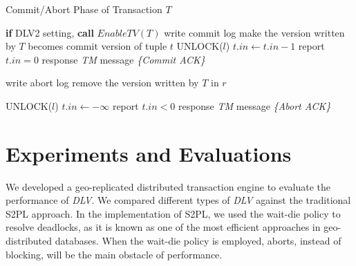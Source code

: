 \documentclass[conference]{IEEEtran}
\begin{document}
\begin{algorithm}[!h]
  \caption{Commit/Abort Phase of Transaction ${T}$}
  \begin{algorithmic}[1]
    \State \textbf{if} DLV2 setting, \textbf{call} ${EnableTV(T)}$ 
    \State write commit log
      \State make the version written by ${T}$ becomes commit version of tuple ${t}$ 
    \EndFor
      \State UNLOCK(${l}$)
    \EndFor
      \State ${t.in \gets t.in - 1}$ 
        \State report ${t.in = 0}$ 
      \EndIf
    \EndFor
    \State response \emph{TM} message \emph{\{Commit ACK\}}
    \label{func:commit}
  \EndFunction
  \end{algorithmic}
  \begin{algorithmic}[1]
  \State write abort log
    \State remove the version written by ${T}$ in ${r}$
\EndFor

      \State UNLOCK(${l}$)
    \EndFor
      \State ${t.in \gets -\infty }$
      \State report ${t.in < 0}$ 
    \EndFor
    \State response \emph{TM} message \emph{\{Abort ACK\}}
    \label{func:abort}
  \EndFunction
  \end{algorithmic}

  \label{alg:commit_phase}
\end{algorithm}

\section{Experiments and Evaluations}
\label{sec:experiments}
We developed a geo-replicated distributed transaction engine to evaluate the performance of \emph{DLV}.
We compared different types of \emph{DLV} against the traditional S2PL approach. 
In the implementation of S2PL, we used the wait-die policy to resolve deadlocks, as it is known as one of the most efficient approaches in geo-distributed databases.
When the wait-die policy is employed, aborts, instead of blocking, will be the main obstacle of performance. 
\end{document}
